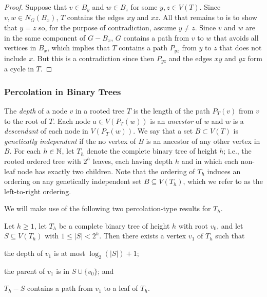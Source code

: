 \documentclass{patmorin}
\newcommand{\defin}[1]{\emph{\color{brightmaroon}#1}}
\begin{document}
\begin{proof}
  Suppose that $v\in B_y$ and $w\in B_z$ for some $y,z\in V(T)$.  Since $v,w\in N_G(B_x)$, $T$ contains the edges $xy$ and $xz$.  All that remains to is to show that $y=z$ so, for the purpose of contradiction, assume $y\neq z$.  Since $v$ and $w$ are in the same component of $G-B_x$, $G$ contains a path from $v$ to $w$ that avoids all vertices in $B_x$, which implies that $T$ contains a path $P_{yz}$ from $y$ to $z$ that does not include $x$.  But this is a contradiction since then $P_{yz}$ and the edges $xy$ and $yz$ form a cycle in $T$.
\end{proof}

\subsubsection{Percolation in Binary Trees}


The \defin{depth} of a node $v$ in a rooted tree $T$ is the length of the path $P_T(v)$ from $v$ to the root of $T$.  Each node $a\in V(P_T(w))$ is an \defin{ancestor} of $w$ and $w$ is a \defin{descendant} of each node in $V(P_T(w))$.  We say that a set $B\subset V(T)$ is \defin{genetically independent} if the no vertex of $B$ is an ancestor of any other vertex in $B$.  For each $h\in\mathbb{N}$, let $T_h$ denote the complete binary tree of height $h$; i.e., the rooted ordered tree with $2^h$ leaves, each having depth $h$ and in which each non-leaf node has exactly two children.  Note that the ordering of $T_h$ induces an ordering on any genetically independent set $B\subseteq V(T_h)$, which we refer to as the left-to-right ordering.

We will make use of the following two percolation-type results for $T_h$. 

\begin{lem}\label{one_path}
  Let $h\ge 1$, let $T_h$ be a complete binary tree of height $h$ with root $v_0$, and let $S\subseteq V(T_h)$ with $1\le |S|< 2^h$. Then there exists a vertex $v_1$ of $T_h$ such that
  \begin{compactenum}[(i)]
    \item the depth of $v_1$ is at most $\log_2(|S|)+1$;
    \item the parent of $v_1$ is in $S\cup\{v_0\}$; and
    \item $T_h-S$ contains a path from $v_1$ to a leaf of $T_h$.
  \end{compactenum} 
\end{lem}
\end{document}
